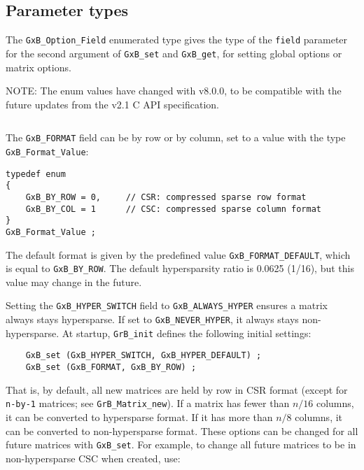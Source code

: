 \documentclass[12pt]{article}
\begin{document}
\subsection{Parameter types}
The \verb'GxB_Option_Field' enumerated type gives the type of the \verb'field'
parameter for the second argument of \verb'GxB_set' and \verb'GxB_get',
for setting global options or matrix options.

NOTE: The enum values have changed with v8.0.0, to be compatible with the
future updates from the v2.1 C API specification.

{\footnotesize
\begin{verbatim}
\end{verbatim} }

The \verb'GxB_FORMAT' field can be by row or by column, set to a value
with the type \verb'GxB_Format_Value':

{\footnotesize
\begin{verbatim}
typedef enum
{
    GxB_BY_ROW = 0,     // CSR: compressed sparse row format
    GxB_BY_COL = 1      // CSC: compressed sparse column format
}
GxB_Format_Value ;
\end{verbatim} }

The default format is given by the predefined value \verb'GxB_FORMAT_DEFAULT',
which is equal to \verb'GxB_BY_ROW'.
The default hypersparsity
ratio is 0.0625 (1/16), but this value may change in the future.

Setting the \verb'GxB_HYPER_SWITCH' field to \verb'GxB_ALWAYS_HYPER' ensures a matrix
always stays hypersparse.  If set to \verb'GxB_NEVER_HYPER', it always stays
non-hypersparse.  At startup, \verb'GrB_init' defines the following initial
settings:

{\footnotesize
\begin{verbatim}
    GxB_set (GxB_HYPER_SWITCH, GxB_HYPER_DEFAULT) ;
    GxB_set (GxB_FORMAT, GxB_BY_ROW) ;
\end{verbatim} }

That is, by default, all new matrices are held by row in CSR format (except
for \verb'n-by-1' matrices; see \verb'GrB_Matrix_new').
If a matrix has fewer than $n/16$
columns, it can be converted to hypersparse format.  If it has more than $n/8$
columns, it can be converted to non-hypersparse format.  These options can be
changed for all future matrices with \verb'GxB_set'.  For example, to change
all future matrices to be in non-hypersparse CSC when created, use:
\end{document}
